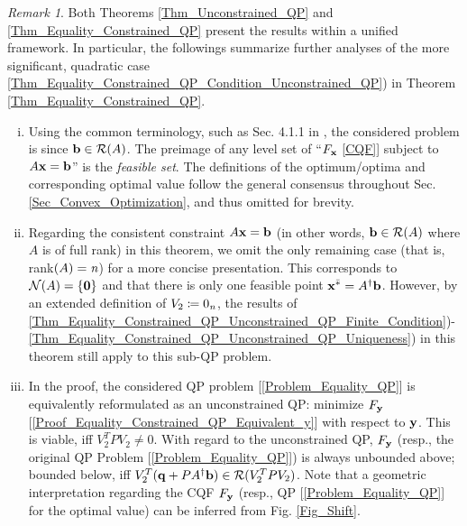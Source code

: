 \documentclass[9pt,twocolumn,twoside,lineno]{pnas-new-1}
\newcommand{\bfb}{{\bf b}}
\newcommand{\bfx}{{\bf x}}
\newcommand{\bfq}{{\bf q}}
\newcommand{\bfy}{{\bf y}}
\newcommand{\bfzero}{{\bf 0}}
\newcommand{\calN}{{\mathcal N}}
\newcommand{\calR}{{\mathcal R}}
\newcommand{\itn}{{\it n}}
\theoremstyle{remark}
\newtheorem{remark}{Remark}[section]
\begin{document}
\begin{remark}
Both Theorems \ref{Thm_Unconstrained_QP} and \ref{Thm_Equality_Constrained_QP} present the results within a unified framework. In particular, the followings summarize further analyses of the more significant, quadratic case \ref{Thm_Equality_Constrained_QP_Condition_Unconstrained_QP}) in Theorem \ref{Thm_Equality_Constrained_QP}.
\begin{enumerate}[i)]
\item Using the common terminology, such as Sec. 4.1.1 in \cite{BoVa:04}, the considered problem is  since $\bfb\in\calR(A)$. The preimage of any level set of ``$F_\bfx$ \ref{CQF}] subject to $A\bfx=\bfb$'' is the \textit{feasible set}. The definitions of the optimum/optima and corresponding optimal value follow the general consensus \citep{BoVa:04} throughout Sec. \ref{Sec_Convex_Optimization}, and thus omitted for brevity.
\item\label{Rem_Thm_Equality_Constrained_QP_Vertex} Regarding the consistent constraint $A\bfx=\bfb$ (in other words, $\bfb\in\calR(A)$ where $A$ is of full rank) in this theorem, we omit the only remaining case (that is, rank$(A)=\itn$) for a more concise presentation. This corresponds to $\calN(A)=\{\bfzero\}$ and that there is only one feasible point $\bfx^{\bar *}=A^\dagger\bfb$. However, by an extended definition of $V_2\coloneqq 0_\itn$, the results of \ref{Thm_Equality_Constrained_QP_Unconstrained_QP_Finite_Condition})-\ref{Thm_Equality_Constrained_QP_Unconstrained_QP_Uniqueness}) in this theorem still apply to this sub-QP problem.
\item\label{Rem_Thm_Equality_Constrained_QP_Boundedness} In the proof, the considered QP problem [\ref{Problem_Equality_QP}] is equivalently reformulated as an unconstrained QP: minimize $F_\bfy$ [\ref{Proof_Equality_Constrained_QP_Equivalent_y}] with respect to $\bfy$. This is viable, iff $V_2^TPV_2\ne 0$. With regard to the unconstrained QP, $F_\bfy$ (resp., the original QP Problem [\ref{Problem_Equality_QP}]) is always unbounded above; bounded below, iff $V_2^T(\bfq+PA^\dagger\bfb)\in\calR(V_2^TPV_2)$. Note that a geometric interpretation regarding the CQF $F_\bfy$ (resp., QP [\ref{Problem_Equality_QP}] for the optimal value) can be inferred from Fig. \ref{Fig_Shift}.
\end{enumerate}
\label{Rem_Thm_Equality_Constrained_QP}
\end{remark}
\end{document}
